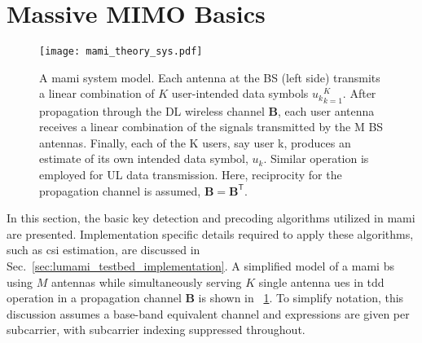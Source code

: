 \documentclass[journal]{IEEEtran}
\begin{document}
%
%
%
%
%
%

\section{Massive MIMO Basics}
\label{sec:MaMi_Theory}
\begin{figure}[!t]
	\centering
	\texttt{[image: mami\_theory\_sys.pdf]}
	\caption{A \gls{mami} system model. Each antenna at the BS (left side) transmits a linear combination of $K$ user-intended data symbols ${u_k}_{k=1}^K$. After propagation through the DL wireless channel $\bm{B}$, each user antenna receives a linear combination of the signals transmitted by the M BS antennas. Finally, each of the K users, say user k, produces an estimate of its own intended data symbol, \ie $u_k$. Similar operation is employed for UL data transmission. Here, reciprocity for the propagation channel is assumed, \ie $\bm{B}=\bm{B}^\mathsf{T}$.}
	\label{fig:system_model}
\end{figure}
In this section, the basic key detection and precoding algorithms utilized in \gls{mami} are presented.
Implementation specific details required to apply these algorithms, such as \gls{csi} estimation, are discussed in Sec.~\ref{sec:lumami_testbed_implementation}.
A simplified model of a \gls{mami} \gls{bs} using $M$ antennas while simultaneously serving $K$ single antenna \glspl{ue} in \gls{tdd} operation in a propagation channel $\bm{B}$ is shown in \figurename~\ref{fig:system_model}.
To simplify notation, this discussion assumes a base-band equivalent channel and expressions are given per subcarrier, with subcarrier indexing suppressed throughout.

%

\begin{table}[t]
	\centering
	\renewcommand{\arraystretch}{1.3}
	\setlength{\abovecaptionskip}{0pt}
	\footnotesize
	\caption{Linear Precoding/Detection Matrices}
	\label{tab:Linear_Det_Pre_Schemes}
\end{table}
\end{document}

